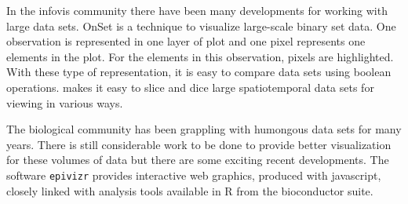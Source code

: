 \documentclass[11pt]{article}
\begin{document}

In the infovis community there have been many developments for working with large data sets. OnSet \citep{sadana2014onset} is a technique to visualize large-scale binary set data. One observation is represented in one layer of plot and one pixel represents one elements in the plot. For the elements in this observation, pixels are highlighted. With these type of representation, it is easy to compare data sets using boolean operations. \citet{nanocubes} makes it easy to slice and dice large spatiotemporal data sets for viewing in various ways.

The biological community has been grappling with humongous data sets for many years. There is still considerable work to be done to provide better visualization for these volumes of data but there are some exciting recent developments. The software {\tt epivizr} \citep{epivizr} provides interactive web graphics, produced with javascript, closely linked with analysis tools available in R from the bioconductor suite.


	
	
\end{document}
